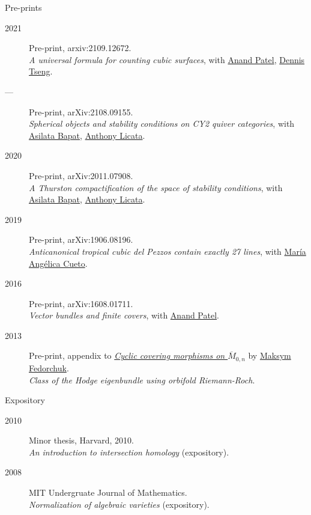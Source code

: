 \documentclass[11pt]{article}
\begin{document}
\begin{description}
\item[{Pre-prints}] 
\end{description}
\begin{description}
\item[{2021}] Pre-print, arxiv:2109.12672.\\
\emph{A universal formula for counting cubic surfaces}, with \href{https://sites.google.com/view/anand-patel}{Anand Patel}, \href{https://sites.google.com/view/dennis-tseng}{Dennis Tseng}.
\item[{---}] Pre-print, arXiv:2108.09155.\\
\emph{Spherical objects and stability conditions on CY2 quiver categories}, with \href{https://asilata.github.io/}{Asilata Bapat}, \href{https://maths-people.anu.edu.au/\~licatat/}{Anthony Licata}.
\item[{2020}] Pre-print, arXiv:2011.07908.\\
\emph{A Thurston compactification of the space of stability conditions}, with \href{https://asilata.github.io/}{Asilata Bapat}, \href{https://maths-people.anu.edu.au/\~licatat/}{Anthony Licata}.
\item[{2019}] Pre-print, arXiv:1906.08196.\\
\emph{Anticanonical tropical cubic del Pezzos contain exactly 27 lines}, with \href{https://people.math.osu.edu/cueto.5/}{María Angélica Cueto}.
\item[{2016}] Pre-print, arXiv:1608.01711.\\
\emph{Vector bundles and finite covers}, with \href{https://sites.google.com/view/anand-patel}{Anand Patel}.
\item[{2013}] Pre-print, appendix to \href{https://drive.google.com/file/d/1wq-Fh3DiqODc51t-J0phIexVF7B4lxsY/view}{\emph{Cyclic covering morphisms on \(\overline M_{0,n}\)}} by \href{https://www2.bc.edu/maksym-fedorchuk/}{Maksym Fedorchuk}.\\
\emph{Class of the Hodge eigenbundle using orbifold Riemann-Roch}.
\end{description}

\begin{description}
\item[{Expository}] 
\end{description}
\begin{description}
\item[{2010}] Minor thesis, Harvard, 2010.\\
\emph{An introduction to intersection homology} (expository).
\item[{2008}] MIT Undergruate Journal of Mathematics.\\
\emph{Normalization of algebraic varieties} (expository).
\end{description}
\end{document}

